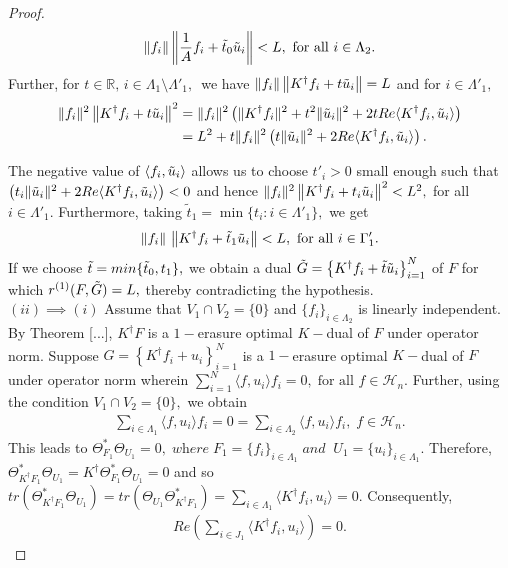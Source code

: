 \documentclass[final,1p,times]{elsarticle}
\begin{document}
\begin{proof}
$$   \|f_i\|\left\|\frac{1}{A}f_i + \tilde{t}_0 \Tilde{u}_i \right\|  < L, \text{ for all } i \in \Lambda_2. $$
Further, for $t \in \mathbb{R},\,i \in \Lambda_1 \setminus \Lambda'_1 , \,$ we have $  \|f_i\| \left\|K^\dag f_i +t\Tilde{u}_i \right\|  = L$ and for   $i \in \Lambda'_1 ,$ 
\begin{align*}
\|f_i\|^2\left\|K^\dag f_i +t\Tilde{u}_i \right\|^2  &=  \|f_i\|^2 \left( \|K^\dag f_i\|^2 + t^2\|\Tilde{u}_i\|^2 + 2t Re\langle K^\dag f_i,\Tilde{u}_i\rangle \right) \\&= L^2 +  t \|f_i\|^2 \left(  t\|\Tilde{u}_i\|^2 + 2 Re\langle K^\dag f_i,\Tilde{u}_i\rangle\right) .
\end{align*}

\normalsize
The negative value of $\langle  f_i, \Tilde{u}_i \rangle $ allows us to choose $t'_i >0$ small enough such that $\left(  t_i \|\Tilde{u}_i\|^2 + 2 Re\langle K^\dag f_i,\Tilde{u}_i\rangle\right)< 0$ and hence $\|f_i\|^2\left\|K^\dag f_i +t_i \Tilde{u}_i \right\|^2 <L^2, $ for all $i \in \Lambda'_1 .$  Furthermore, taking $\tilde{t}_1 = \min \{t_i : i \in \Lambda'_1\},$ we get   $$\|f_i\|\,\left\|K^\dag f_i +\tilde{t}_1 \Tilde{u}_i \right\|  < L, \text{ for all } i \in \Gamma'_1.$$
If we choose  $\Tilde{t} = min \{ \tilde{t}_0,t_1\},$ we obtain a dual $\Tilde{G}= \left\{ K^\dag f_i + \Tilde{t}\Tilde{u}_i\\\\\right\}_{i=1}^N$ of $F$ for which $r^{(1)}(F,\Tilde{G}) = L,$ thereby contradicting the hypothesis.\\

$(ii) \implies (i)$   Assume that $V_1 \cap V_2 = \{0\}$ and  $\{f_i\}_{i \in \Lambda_2}$ is linearly independent. By Theorem [...],  $K^\dag F $ is a $1-$erasure optimal $K-$dual of $F$ under operator norm. Suppose $G= \left\{ K^\dag f_i +u_i \right\}_{i=1}^N $  is a $1-$erasure optimal $K-$dual of $F$ under operator norm  wherein $\displaystyle{ \sum_{i=1}^N \langle f,u_i \rangle f_i = 0} ,\; \text{for all }f \in \mathcal{H}_n.$ Further, using the condition $V_1 \cap V_2 = \{0\},$ we obtain 
\begin{align}\label{eqn4.10}
	\sum\limits_{i \in  \Lambda_1 } \langle f,u_i \rangle f_i =0 =\sum\limits_{i \in  \Lambda_2 } \langle f,u_i \rangle f_i, \;f \in \mathcal{H}_n.
\end{align}
 This leads to $\Theta_{F_1}^* \Theta_{U_1} = 0, \; \textit{where} \; F_1 = \{f_i\}_{i \in  \Lambda_1}\; \textit{and} \;\; U_1 = \{u_i\}_{ i \in  \Lambda_1}.$ Therefore, $\Theta_{K^\dag F_1}^* \Theta_{U_1} = K^\dag \Theta_{F_1}^* \Theta_{U_1} =0 $ and so	$	tr\left(\Theta_{K^\dag F_1}^* \Theta_{U_1}\right) = tr\left( \Theta_{U_1} \Theta_{K^\dag F_1}^* \right)  =\sum\limits_{i \in  \Lambda_1 } \langle K^\dag f_i , u_i \rangle = 0.$ Consequently,
\begin{align}\label{eqn4.11}
	Re \left(\sum\limits_{i \in  J_1 } \langle K^\dag f_i , u_i \rangle \right) = 0.
\end{align}


\end{proof}
\end{document}
